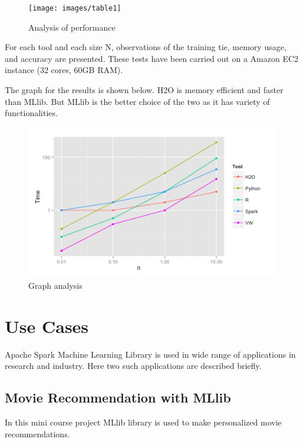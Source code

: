 \documentclass[9pt,twocolumn,twoside]{styles/osajnl}
\begin{document}
\begin{figure}[htbp]
\begin{center}
\centering
\texttt{[image: images/table1]}
\caption{Analysis of performance}
\label{fig:false-color}
\end{center}
\end{figure}

For each tool and each size N, observations of the training tie,
memory usage, and accuracy are presented. These tests have been
carried out on a Amazon EC2 instance (32 cores, 60GB
RAM).\cite{Analysis-webpage}

The graph for the results is shown below. H2O is memory efficient and
faster than MLlib. But MLlib is the better choice of the two as it has
variety of functionalities.

\begin{figure}[htbp]
\begin{center}
\centering
\includegraphics[width=\linewidth]{images/analysisgraph}
\caption{Graph analysis}
\label{fig:false-color}
\end{center}
\end{figure}

\section{Use Cases}
Apache Spark Machine Learning Library is used in wide range of applications
in research and industry. Here two such applications are described
briefly.

\subsection{Movie Recommendation with MLlib}
In this mini course project MLlib library is used to make personalized
movie recommendations.\cite{Movie-Recommender}
\end{document}
